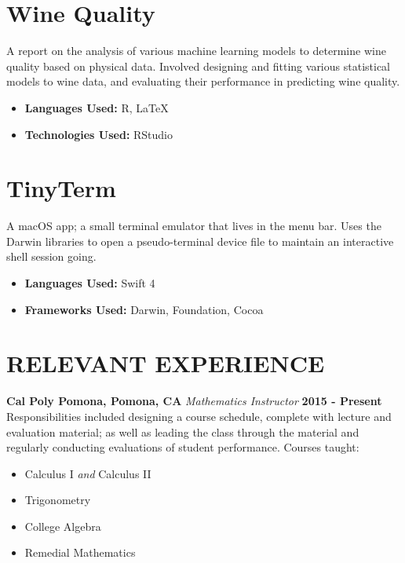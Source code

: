 \documentclass[margin]{res}
\begin{document}
\begin{resume}
\normalsize{\section{Wine Quality}}
A report on the analysis of various machine learning models to determine wine
quality based on physical data.
Involved designing and fitting various statistical models to wine data, and
evaluating their performance in predicting wine quality.
\begin{itemize}
\item {\bf Languages Used: } R, LaTeX
\item {\bf Technologies Used: } RStudio
\end{itemize}

\normalsize{\section{TinyTerm}} A macOS app; a small terminal emulator that
lives in the menu bar. Uses the Darwin libraries to open a pseudo-terminal
device file to maintain an interactive shell session going.
\begin{itemize}
\item {\bf Languages Used: } Swift 4
\item {\bf Frameworks Used: } Darwin, Foundation, Cocoa
\end{itemize}

\section{RELEVANT EXPERIENCE}
{\bf Cal Poly Pomona, Pomona, CA}\newline
{\it Mathematics Instructor}\newline
{\bf 2015 - Present}\newline
Responsibilities included designing a course schedule, complete with lecture and
evaluation material; as well as leading the class through the material and
regularly conducting evaluations of student performance.\newline
Courses taught:
\begin{multicols}{2}
\begin{itemize}
\item Calculus I {\it and} Calculus II
\item Trigonometry
  \columnbreak
\item College Algebra
\item Remedial Mathematics
\end{itemize}
\end{multicols}


\end{resume}
\end{document}
